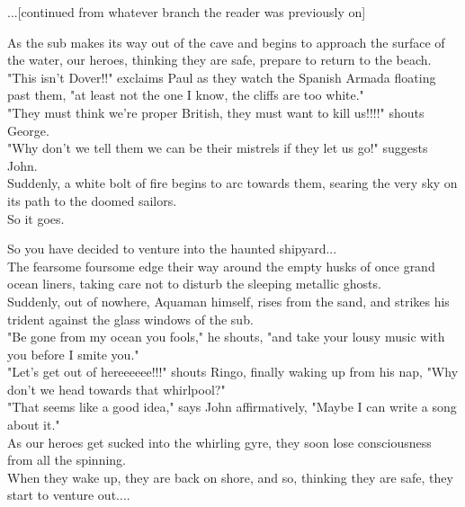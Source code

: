 \documentclass{article}
\begin{document}
...[continued from whatever branch the reader was previously on]

As the sub makes its way out of the cave and begins to approach the surface of the water, our heroes, thinking they are safe, prepare to return to the beach.\\

"This isn't Dover!!" exclaims Paul as they watch the Spanish Armada floating past them, "at least not the one I know, the cliffs are too white."\\

"They must think we're proper British, they must want to kill us!!!!" shouts George.\\

"Why don't we tell them we can be their mistrels if they let us go!" suggests John.\\

Suddenly, a white bolt of fire begins to arc towards them, searing the very sky on its path to the doomed sailors.\\

So it goes.

So you have decided to venture into the haunted shipyard...\\

The fearsome foursome edge their way around the empty husks of once grand ocean liners, taking care not to disturb the sleeping metallic ghosts.\\

Suddenly, out of nowhere, Aquaman himself, rises from the sand, and strikes his trident against the glass windows of the sub.\\

"Be gone from my ocean you fools," he shouts, "and take your lousy music with you before I smite you."\\

"Let's get out of hereeeeee!!!" shouts Ringo, finally waking up from his nap, "Why don't we head towards that whirlpool?"\\

"That seems like a good idea," says John affirmatively, "Maybe I can write a song about it."\\

As our heroes get sucked into the whirling gyre, they soon lose consciousness from all the spinning.\\

When they wake up, they are back on shore, and so, thinking they are safe, they start to venture out....
\end{document}
